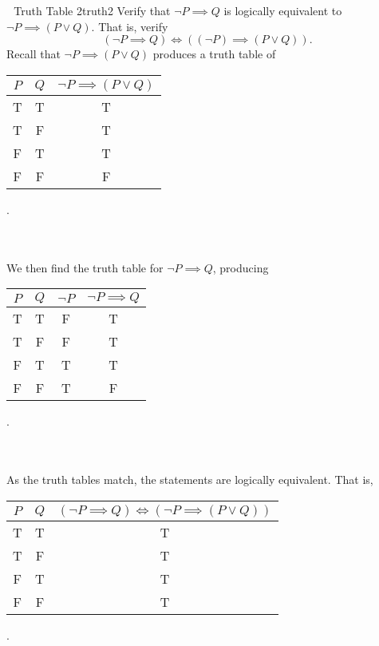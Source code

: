 \begin{example}{\Difficulty\,\Difficulty\,\Difficulty\,\,Truth Table 2}{truth2}
            Verify that \(\neg P \implies Q\) is logically equivalent to \(\neg P \implies (P\vee Q)\). That is, verify
            \begin{equation*}
                (\neg P \implies Q)\iff((\neg P)\implies (P\vee Q)).
            \end{equation*}
            Recall that \(\neg P\implies (P\vee Q)\) produces a truth table of
            \begin{center}
                \begin{tabular}{c|c|c}
                    \hline
                    \(P\) & \(Q\) & \(\neg P\implies (P\vee Q)\) \\
                    \hline
                    T & T & T \\
                    T & F & T \\
                    F & T & T \\
                    F & F & F \\
                    \hline
                \end{tabular}.
            \end{center}
            \vphantom
            \\
            \\
            We then find the truth table for \(\neg P\implies Q\), producing
            \begin{center}
                \begin{tabular}{c|c|c|c}
                    \hline
                    \(P\) & \(Q\) & \(\neg P\) & \(\neg P \implies Q\) \\
                    \hline
                    T & T & F & T\\
                    T & F & F & T \\
                    F & T & T & T \\
                    F & F & T & F \\
                    \hline
                \end{tabular}.
            \end{center}
            \vphantom
            \\
            \\
            As the truth tables match, the statements are logically equivalent. That is,
            \begin{center}
                \begin{tabular}{c|c|c}
                    \hline
                    \(P\) & \(Q\) & \((\neg P \implies Q)\iff(\neg P\implies (P\vee Q))\) \\
                    \hline
                    T & T & T \\
                    T & F & T \\
                    F & T & T \\
                    F & F & T \\
                    \hline
                \end{tabular}.
            \end{center}
        
        \end{example}

